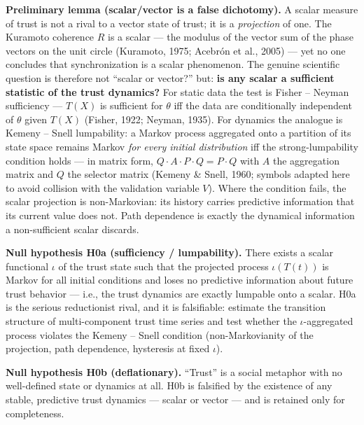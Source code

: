 \documentclass[
]{article}
\begin{document}
\textbf{Preliminary lemma (scalar/vector is a false dichotomy).} A
scalar measure of trust is not a rival to a vector state of trust; it is
a \emph{projection} of one. The Kuramoto coherence \(R\) is a scalar ---
the modulus of the vector sum of the phase vectors on the unit circle
(Kuramoto, 1975; Acebrón et al., 2005) --- yet no one concludes that
synchronization is a scalar phenomenon. The genuine scientific question
is therefore not ``scalar or vector?'' but: \textbf{is any scalar a
sufficient statistic of the trust dynamics?} For static data the test is
Fisher -- Neyman sufficiency --- \(T(X)\) is sufficient for \(\theta\)
iff the data are conditionally independent of \(\theta\) given \(T(X)\)
(Fisher, 1922; Neyman, 1935). For dynamics the analogue is Kemeny --
Snell lumpability: a Markov process aggregated onto a partition of its
state space remains Markov \emph{for every initial distribution} iff the
strong-lumpability condition holds --- in matrix form,
\(Q \cdot A \cdot P \cdot Q = P \cdot Q\) with \(A\) the aggregation
matrix and \(Q\) the selector matrix (Kemeny \& Snell, 1960; symbols
adapted here to avoid collision with the validation variable \(V\)).
Where the condition fails, the scalar projection is non-Markovian: its
history carries predictive information that its current value does not.
Path dependence is exactly the dynamical information a non-sufficient
scalar discards.

\textbf{Null hypothesis H0a (sufficiency / lumpability).} There exists a
scalar functional \(\iota\) of the trust state such that the projected
process \(\iota(T(t))\) is Markov for all initial conditions and loses
no predictive information about future trust behavior --- i.e., the
trust dynamics are exactly lumpable onto a scalar. H0a is the serious
reductionist rival, and it is falsifiable: estimate the transition
structure of multi-component trust time series and test whether the
\(\iota\)-aggregated process violates the Kemeny -- Snell condition
(non-Markovianity of the projection, path dependence, hysteresis at
fixed \(\iota\)).

\textbf{Null hypothesis H0b (deflationary).} ``Trust'' is a social
metaphor with no well-defined state or dynamics at all. H0b is falsified
by the existence of any stable, predictive trust dynamics --- scalar or
vector --- and is retained only for completeness.
\end{document}

